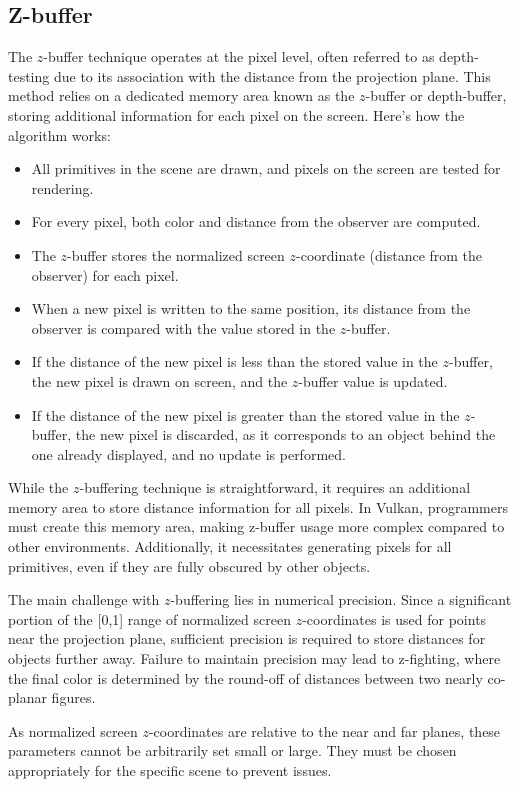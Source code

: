 \subsection{Z-buffer}
The $z$-buffer technique operates at the pixel level, often referred to as depth-testing due to its association with the distance from the projection plane. 
This method relies on a dedicated memory area known as the $z$-buffer or depth-buffer, storing additional information for each pixel on the screen.
Here's how the algorithm works:
\begin{itemize}
    \item All primitives in the scene are drawn, and pixels on the screen are tested for rendering.
    \item For every pixel, both color and distance from the observer are computed.
    \item The $z$-buffer stores the normalized screen $z$-coordinate (distance from the observer) for each pixel.
    \item When a new pixel is written to the same position, its distance from the observer is compared with the value stored in the $z$-buffer.
    \item If the distance of the new pixel is less than the stored value in the $z$-buffer, the new pixel is drawn on screen, and the $z$-buffer value is updated.
    \item If the distance of the new pixel is greater than the stored value in the $z$-buffer, the new pixel is discarded, as it corresponds to an object behind the one already displayed, and no update is performed.
\end{itemize}
While the $z$-buffering technique is straightforward, it requires an additional memory area to store distance information for all pixels.
In Vulkan, programmers must create this memory area, making z-buffer usage more complex compared to other environments. 
Additionally, it necessitates generating pixels for all primitives, even if they are fully obscured by other objects.

The main challenge with $z$-buffering lies in numerical precision. 
Since a significant portion of the [0,1] range of normalized screen $z$-coordinates is used for points near the projection plane, sufficient precision is required to store distances for objects further away. 
Failure to maintain precision may lead to z-fighting, where the final color is determined by the round-off of distances between two nearly co-planar figures.

As normalized screen $z$-coordinates are relative to the near and far planes, these parameters cannot be arbitrarily set small or large. 
They must be chosen appropriately for the specific scene to prevent issues.


